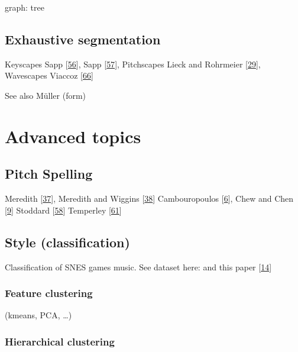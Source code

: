 \documentclass[letterpaper,10pt,english]{sphinxmanual}
\begin{document}
\sphinxAtStartPar
graph: tree


\section{Exhaustive segmentation}
\label{\detokenize{5_segmentation:exhaustive-segmentation}}
\sphinxAtStartPar
Keyscapes Sapp {[}\hyperlink{cite.8_bibliography:id39}{56}{]}, Sapp {[}\hyperlink{cite.8_bibliography:id40}{57}{]},
Pitchscapes Lieck and Rohrmeier {[}\hyperlink{cite.8_bibliography:id33}{29}{]},
Wavescapes Viaccoz  {[}\hyperlink{cite.8_bibliography:id53}{66}{]}

\sphinxAtStartPar
See also Müller (form)


\chapter{Advanced topics}
\label{\detokenize{6_advanced:advanced-topics}}\label{\detokenize{6_advanced::doc}}

\section{Pitch Spelling}
\label{\detokenize{6_advanced:pitch-spelling}}\label{\detokenize{6_advanced:id1}}
\sphinxAtStartPar
Meredith {[}\hyperlink{cite.8_bibliography:id27}{37}{]}, Meredith and Wiggins {[}\hyperlink{cite.8_bibliography:id26}{38}{]}
Cambouropoulos {[}\hyperlink{cite.8_bibliography:id28}{6}{]}, Chew and Chen {[}\hyperlink{cite.8_bibliography:id29}{9}{]}
Stoddard  {[}\hyperlink{cite.8_bibliography:id30}{58}{]}
Temperley {[}\hyperlink{cite.8_bibliography:id31}{61}{]}


\section{Style (classification)}
\label{\detokenize{6_advanced:style-classification}}
\sphinxAtStartPar
Classification of SNES games music. See dataset here: 
and this paper {[}\hyperlink{cite.8_bibliography:id34}{14}{]}


\subsection{Feature clustering}
\label{\detokenize{6_advanced:feature-clustering}}
\sphinxAtStartPar
(k\sphinxhyphen{}means, PCA, …)


\subsection{Hierarchical clustering}
\label{\detokenize{6_advanced:hierarchical-clustering}}
\end{document}
